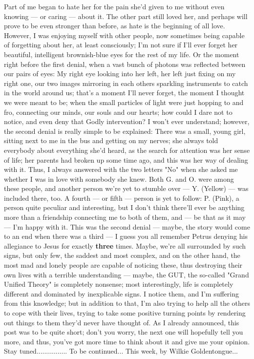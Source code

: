 Part of me began to hate her for the pain she'd given to me without even knowing --- or caring --- about it. 
The other part still loved her, and perhaps will prove to be even stronger than before, as hate is the beginning of all love. 
However, I was enjoying myself with other people, now sometimes being capable of forgetting about her, at least consciously; I'm not sure if I'll ever forget her beautiful, intelligent brownish-blue eyes for the rest of my life. 
Or the moment right before the first denial, when a vast bunch of photons was reflected between our pairs of eyes: My right eye looking into her left, her left just fixing on my right one, our two images mirroring in each others sparkling instruments to catch in the world around us; that's a moment I'll never forget, the moment I thought we were meant to be; when the small particles of light were just hopping to and fro, connecting our minds, our souls and our hearts; how could I dare not to notice, and even deny that Godly intervention?
I won't ever understand; however, the second denial is really simple to be explained: 
There was a small, young girl, sitting next to me in the bus and getting on my nerves; she always told everybody about everything she'd heard, as the search for attention was her sense of life; her parents had broken up some time ago, and this was her way of dealing with it. 
Thus, I always answered with the two letters "No" when she asked me whether I was in love with somebody she knew. 
Both G. and O. were among these people, and another person we're yet to stumble over --- Y. (Yellow) --- was included there, too. 
A fourth --- or fifth --- person is yet to follow: P. (Pink), a person quite peculiar and interesting, but I don't think there'll ever be anything more than a friendship connecting me to both of them, and --- be that as it may --- I'm happy with it. 
This was the second denial --- maybe, the story would come to an end when there was a third --- I guess you all remember Petrus denying his allegiance to Jesus for exactly \textbf{three} times. 
Maybe, we're all surrounded by such signs, but only few, the saddest and most complex, and on the other hand, the most mad and lonely people are capable of noticing these, thus destroying their own lives with a terrible understanding --- maybe, the GUT, the so-called "Grand Unified Theory" is completely nonsense; most interestingly, life is completely different and dominated by inexplicable signs. 
I notice them, and I'm suffering from this knowledge; but in addition to that, I'm also trying to help all the others to cope with their lives, trying to take some positive turning points by rendering out things to them they'd never have thought of. 
As I already announced, this post was to be quite short; don't you worry, the next one will hopefully tell you more, and thus, you've got more time to think about it and give me your opinion. 
Stay tuned................
To be continued...
This week, by Wilkie Goldentongue...

